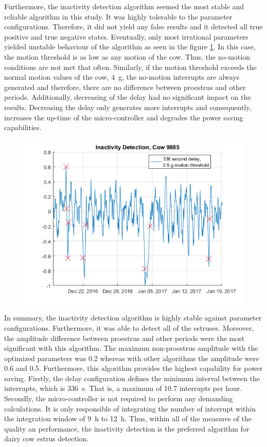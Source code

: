 \documentclass[english,12pt,a4paper,pdftex,elec,utf8]{aaltothesis}
\begin{document}
Furthermore, the inactivity detection algorithm seemed the most stable and reliable algorithm in this study. It was highly tolerable to the parameter configurations. Therefore, it did not yield any false results and it detected all true positive and true negative states. Eventually, only most irrational parameters yielded unstable behaviour of the algorithm as seen in the figure \ref{InactivityDetectionCow9885_336period05threshold}. In this case, the motion threshold is as low as any motion of the cow. Thus, the no-motion conditions are not met that often. Similarly, if the motion threshold exceeds the normal motion values of the cow, \SI{4}{\gram}, the no-motion interrupts are always generated and therefore, there are no difference between proestrus and other periods. Additionally, decreasing of the delay had no significant impact on the results. Decreasing the delay only generates more interrupts and consequently, increases the up-time of the micro-controller and degrades the power saving capabilities. 

\begin{figure}[htb]
\centering
\includegraphics[width = 0.75 \textwidth]{figures/InactivityDetectionCow9885_336period05threshold.png}
\caption{}
\label{InactivityDetectionCow9885_336period05threshold}
\end{figure}

In summary, the inactivity detection algorithm is highly stable against parameter configurations. Furthermore, it was able to detect all of the estruses. Moreover, the amplitude difference between proestrus and other periods were the most significant with this algorithm. The maximum non-proestrus amplitude with the optimized parameters was 0.2 whereas with other algorithms the amplitude were 0.6 and 0.5. Furthermore, this algorithm provides the highest capability for power saving. Firstly, the delay configuration defines the minimum interval between the interrupts, which is \SI{336}{\second}. That is, a maximum of 10.7 interrupts per hour. Secondly, the micro-controller is not required to perform any demanding calculations. It is only responsible of integrating the number of interrupt within the integration window of \SI{9}{\hour} to \SI{12}{\hour}. Thus, within all of the measures of the quality an performance, the inactivity detection is the preferred algorithm for dairy cow estrus detection.
\end{document}
